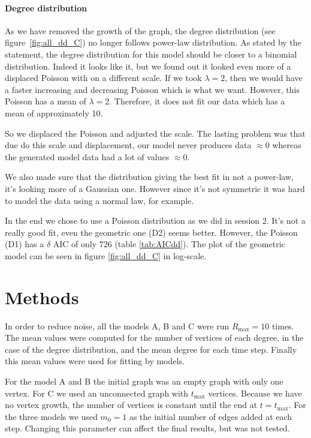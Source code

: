 \documentclass[a4paper]{article}
\begin{document}
\paragraph{Degree distribution}

As we have removed the growth of the graph, the degree distribution (see 
figure~\ref{fig:all_dd_C}) no longer follows power-law distribution. As stated 
by the statement, the degree distribution for this model should be closer to a 
binomial distribution. Indeed it looks like it, but we found out it looked even 
more of a displaced Poisson with on a different scale. If we took $\lambda = 2$, 
then we would have a faster increasing and decreasing Poisson which is what we 
want. However, this Poisson has a mean of $\lambda = 2$.  Therefore, it does not 
fit our data which has a mean of approximately 10.

So we displaced the Poisson and adjusted the scale. The lasting problem was that
due do this scale and displacement, our model never produces data $\approx 0$
whereas the generated model data had a lot of values $\approx 0$.

We also made sure that the distribution giving the best fit in not a power-law,
it's looking more of a Gaussian one. However since it's not symmetric it was
hard to model the data using a normal law, for example.

In the end we chose to use a Poisson distribution as we did in session 2. It's 
not a really good fit, even the geometric one (D2) seems better. However, the 
Poisson (D1) has a $\delta$ AIC of only 726 (table \ref{tab:AICdd}). The plot of 
the geometric model can be seen in figure \ref{fig:all_dd_C} in log-scale.


\section{Methods} \label{methods}

In order to reduce noise, all the models A, B and C were run $R_{\max} = 10$ 
times.  The mean values were computed for the number of vertices of each degree, 
in the case of the degree distribution, and the mean degree for each time step.  
Finally this mean values were used for fitting by models.

For the model A and B the initial graph was an empty graph with only one vertex.  
For C we used an unconnected graph with $t_{\max}$ vertices.  Because we have no 
vertex growth, the number of vertices is constant until the end at $t = 
t_{\max}$.  For the three models we used $m_0 = 1$ as the initial number of 
edges added at each step. Changing this parameter can affect the final results, 
but was not tested.
\end{document}
